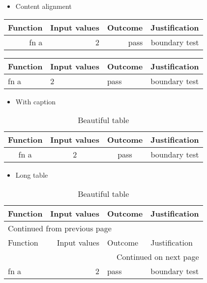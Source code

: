 \documentclass[a4paper,11pt]{article}
\begin{document}
\begin{itemize}
\item Content alignment
\end{itemize}
\begin{center}
\begin{tabular}{|r|r|r|r|}
Function & Input values & Outcome & Justification\\[0pt]
\hline
fn a & 2 & pass & boundary test\\[0pt]
\end{tabular}
\end{center}

\begin{center}
\begin{tabular}{|l|l|l|l|}
Function & Input values & Outcome & Justification\\[0pt]
\hline
fn a & 2 & pass & boundary test\\[0pt]
\end{tabular}
\end{center}

\begin{itemize}
\item With caption
\end{itemize}
\begin{table}[htbp]
\caption{Beautiful table}
\centering
\begin{tabular}{|c|c|c|c|}
Function & Input values & Outcome & Justification\\[0pt]
\hline
fn a & 2 & pass & boundary test\\[0pt]
\end{tabular}
\end{table}

\begin{itemize}
\item Long table
\end{itemize}

\begin{longtable}{lrll}
\caption{Beautiful table}
\\[0pt]
Function & Input values & Outcome & Justification\\[0pt]
\hline
\endfirsthead
\multicolumn{4}{l}{Continued from previous page} \\[0pt]
\hline

Function & Input values & Outcome & Justification \\[0pt]

\hline
\endhead
\hline\multicolumn{4}{r}{Continued on next page} \\
\endfoot
\endlastfoot
\hline
fn a & 2 & pass & boundary test\\[0pt]
\end{longtable}
\end{document}
